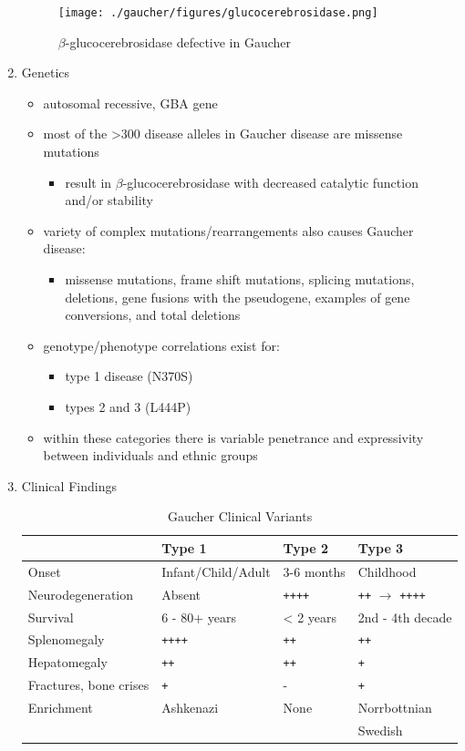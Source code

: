 \documentclass{scrartcl}
\begin{document}
\begin{enumerate}
\begin{figure}[htbp]
\centering
\texttt{[image: ./gaucher/figures/glucocerebrosidase.png]}
\caption{\label{fig:orga7ef89e}
\(\beta\)-glucocerebrosidase defective in Gaucher}
\end{figure}

\item Genetics
\label{sec:org9c7ab94}
\begin{itemize}
\item autosomal recessive, GBA gene
\item most of the >300 disease alleles in Gaucher disease are missense
mutations
\begin{itemize}
\item result in \(\beta\)-glucocerebrosidase with decreased catalytic
function and/or stability
\end{itemize}
\item variety of complex mutations/rearrangements also causes Gaucher
disease:
\begin{itemize}
\item missense mutations, frame shift mutations, splicing mutations,
deletions, gene fusions with the pseudogene, examples of gene
conversions, and total deletions
\end{itemize}
\item genotype/phenotype correlations exist for:
\begin{itemize}
\item type 1 disease (N370S)
\item types 2 and 3 (L444P)
\end{itemize}
\item within these categories there is variable penetrance and
expressivity between individuals and ethnic groups
\end{itemize}

\item Clinical Findings
\label{sec:orgefc67e3}
\begin{table}[htbp]
\caption{\label{tab:org9371863}
Gaucher Clinical Variants}
\centering
\begin{tabular}{llll}
 & Type 1 & Type 2 & Type 3\\
\hline
Onset & Infant/Child/Adult & 3-6 months & Childhood\\
Neurodegeneration & Absent & \texttt{++++} & \texttt{++} \(\to\) \texttt{++++}\\
Survival & 6 - 80+ years & < 2 years & 2nd - 4th decade\\
Splenomegaly & \texttt{++++} & \texttt{++} & \texttt{++}\\
Hepatomegaly & \texttt{++} & \texttt{++} & \texttt{+}\\
Fractures, bone crises & \texttt{+} & - & \texttt{+}\\
Enrichment & Ashkenazi & None & Norrbottnian\\
 &  &  & Swedish\\
\end{tabular}
\end{table}


\end{enumerate}
\end{document}
